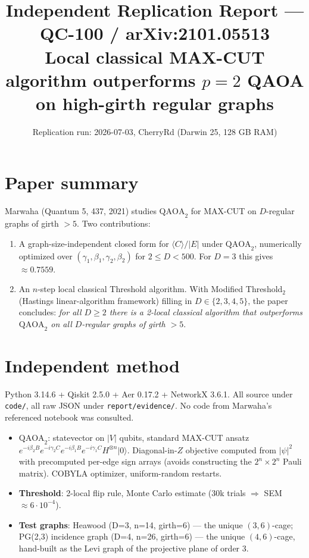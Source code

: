 \documentclass[11pt]{article}
\title{Independent Replication Report --- QC-100 / arXiv:2101.05513\\
\large Local classical MAX-CUT algorithm outperforms $p=2$ QAOA on high-girth regular graphs}
\author{Replication run: 2026-07-03, CherryRd (Darwin 25, 128 GB RAM)}
\date{}
\begin{document}
\maketitle

\section{Paper summary}
Marwaha (Quantum 5, 437, 2021) studies $\text{QAOA}_2$ for MAX-CUT on $D$-regular graphs of girth $>5$. Two contributions:
\begin{enumerate}
  \item A graph-size-independent closed form for $\langle C\rangle/|E|$ under $\text{QAOA}_2$, numerically optimized over $(\gamma_1,\beta_1,\gamma_2,\beta_2)$ for $2\le D<500$. For $D{=}3$ this gives $\approx 0.7559$.
  \item An $n$-step local classical Threshold algorithm. With Modified Threshold$_2$ (Hastings linear-algorithm framework) filling in $D\in\{2,3,4,5\}$, the paper concludes: \emph{for all $D\ge 2$ there is a 2-local classical algorithm that outperforms $\text{QAOA}_2$ on all $D$-regular graphs of girth $>5$}.
\end{enumerate}

\section{Independent method}
Python 3.14.6 + Qiskit 2.5.0 + Aer 0.17.2 + NetworkX 3.6.1. All source under \texttt{code/}, all raw JSON under \texttt{report/evidence/}. No code from Marwaha's referenced notebook was consulted.
\begin{itemize}
  \item \textbf{$\text{QAOA}_2$}: statevector on $|V|$ qubits, standard MAX-CUT ansatz $e^{-i\beta_2 B}e^{-i\gamma_2 C}e^{-i\beta_1 B}e^{-i\gamma_1 C}H^{\otimes n}|0\rangle$. Diagonal-in-$Z$ objective computed from $|\psi|^2$ with precomputed per-edge sign arrays (avoids constructing the $2^n\!\times\!2^n$ Pauli matrix). COBYLA optimizer, uniform-random restarts.
  \item \textbf{Threshold}: 2-local flip rule, Monte Carlo estimate (30k trials $\Rightarrow$ SEM $\approx 6\!\cdot\!10^{-4}$).
  \item \textbf{Test graphs}: Heawood (D=3, n=14, girth=6) --- the unique $(3,6)$-cage; PG(2,3) incidence graph (D=4, n=26, girth=6) --- the unique $(4,6)$-cage, hand-built as the Levi graph of the projective plane of order 3.
\end{itemize}
\end{document}
